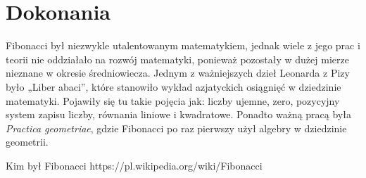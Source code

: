 \documentclass{report}
\begin{document}
\section{Dokonania}
Fibonacci był niezwykle utalentowanym matematykiem, jednak wiele z jego prac i teorii nie oddziałało na rozwój matematyki, ponieważ pozostały w dużej mierze nieznane w okresie średniowiecza.
Jednym z ważniejszych dzieł Leonarda z Pizy było „Liber abaci”, które stanowiło wykład azjatyckich osiągnięć w dziedzinie matematyki. Pojawiły się tu takie pojęcia jak: liczby ujemne, zero, pozycyjny system zapisu liczby, równania liniowe i kwadratowe.
Ponadto ważną pracą była \textit{Practica geometriae}, gdzie Fibonacci po raz pierwszy użył algebry w dziedzinie geometrii.
\newpage
\begin{thebibliography}{9}
 Kim był Fibonacci https://pl.wikipedia.org/wiki/Fibonacci
\end{thebibliography}
\end{document}
